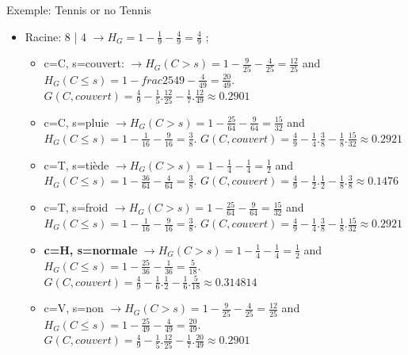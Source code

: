 \documentclass[8pt]{beamer}
\begin{document}
			\begin{frame}{Exemple: Tennis or no Tennis}
				\begin{itemize}
					\item<1-> Racine: 8 | 4 \(\longrightarrow H_G = 1 - \frac{1}{9} - \frac{4}{9} = \frac{4}{9}\) ;
						\begin{itemize}
							\scriptsize
							\item c=C, s=couvert: \(\longrightarrow H_G (C > s) = 1 - \frac{9}{25} - \frac{4}{25} = \frac{12}{25}\) and \(H_G (C \leq s) = 1- frac{25}{49} - \frac{4}{49} = \frac{20}{49}\).
								\(G(C, couvert) = \frac{4}{9} - \frac{1}{5} . \frac{12}{25} - \frac{1}{7} . \frac{12}{49} \approx 0.2901\)
							\item c=C, s=pluie \(\longrightarrow H_G (C > s) = 1 - \frac{25}{64} - \frac{9}{64} = \frac{15}{32}\) and \(H_G (C \leq s) = 1- \frac{1}{16} - \frac{9}{16} = \frac{3}{8}\).
								\(G(C, couvert) = \frac{4}{9} - \frac{1}{4} . \frac{3}{8} - \frac{1}{8} . \frac{15}{32} \approx 0.2921\)
							\item c=T, s=tiède \(\longrightarrow H_G (C > s) = 1 - \frac{1}{4} - \frac{1}{4} = \frac{1}{2}\) and \(H_G (C \leq s) = 1- \frac{36}{64} - \frac{4}{64} = \frac{3}{8}\).
								\(G(C, couvert) = \frac{4}{9} - \frac{1}{2} . \frac{1}{2} - \frac{1}{8} . \frac{3}{8} \approx 0.1476\)
							\item c=T, s=froid \(\longrightarrow H_G (C > s) = 1 - \frac{25}{64} - \frac{9}{64} = \frac{15}{32}\) and \(H_G (C \leq s) = 1- \frac{1}{16} - \frac{9}{16} = \frac{3}{8}\).
								\(G(C, couvert) = \frac{4}{9} - \frac{1}{4} . \frac{3}{8} - \frac{1}{8} . \frac{15}{32} \approx 0.2921\)
							\item \textbf{c=H, s=normale} \(\longrightarrow H_G (C > s) = 1 - \frac{1}{4} - \frac{1}{4} = \frac{1}{2}\) and \(H_G (C \leq s) = 1- \frac{25}{36} - \frac{1}{36} = \frac{5}{18}\).
								\(G(C, couvert) = \frac{4}{9} - \frac{1}{6} . \frac{1}{2} - \frac{1}{6} . \frac{5}{18} \approx 0.314814\)
							\item c=V, s=non \(\longrightarrow H_G (C > s) = 1 - \frac{9}{25} - \frac{4}{25} = \frac{12}{25}\) and \(H_G (C \leq s) = 1- \frac{25}{49} - \frac{4}{49} = \frac{20}{49}\).
								\(G(C, couvert) = \frac{4}{9} - \frac{1}{5} . \frac{12}{25} - \frac{1}{7} . \frac{20}{49} \approx 0.2901\)
						\end{itemize}
				\end{itemize}
			\end{frame}
\end{document}
